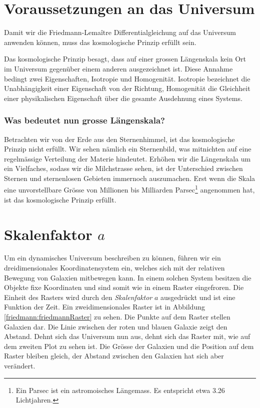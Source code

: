 \begin{refsection}
\section{Voraussetzungen an das Universum}
Damit wir die Friedmann-Lema\^{i}tre Differentialgleichung auf das Universum anwenden können, muss das kosmologische Prinzip erfüllt sein. 
\begin{satz}
	\label{Prinzip:kosmologisches Prinzip}
	Das kosmologische Prinzip besagt, dass auf einer grossen Längenskala kein Ort im Universum gegenüber einem anderen ausgezeichnet ist. Diese Annahme bedingt zwei Eigenschaften, Isotropie und Homogenität. Isotropie  bezeichnet die Unabhängigkeit einer Eigenschaft von der Richtung, Homogenität die Gleichheit einer physikalischen Eigenschaft über die gesamte Ausdehnung eines Systems.
\end{satz}

\subsubsection*{Was bedeutet nun grosse Längenskala?}
Betrachten wir von der Erde aus den Sternenhimmel, ist das kosmologische Prinzip nicht erfüllt. Wir sehen nämlich ein Sternenbild, was mitnichten auf eine regelmässige Verteilung der Materie hindeutet. Erhöhen wir die Längenskala um ein Vielfaches, sodass wir die Milchstrasse sehen, ist der Unterschied zwischen Sternen und sternenlosen Gebieten immernoch auszumachen. Erst wenn die Skala eine unvorstellbare Grösse von Millionen bis Milliarden Parsec\footnote{Ein Parsec ist ein astromoisches Längemass. Es entspricht etwa 3.26 Lichtjahren.} angenommen hat, ist das kosmologische Prinzip erfüllt. 

\section{Skalenfaktor $a$\label{Section:Skalenfaktor}}
Um ein dynamisches Universum beschreiben zu können, führen wir ein dreidimensionales Koordinatensystem ein, welches sich mit der relativen Bewegung von Galaxien mitbewegen kann. In einem solchen System besitzen die Objekte fixe Koordinaten und sind somit wie in einem Raster eingefroren. Die Einheit des Rasters wird durch den {\em Skalenfaktor} $a$ ausgedrückt und ist eine Funktion der Zeit. Ein zweidimensionales Raster ist in Abbildung \ref{friedmann:friedmannRaster} zu sehen. Die Punkte auf dem Raster stellen Galaxien dar. Die Linie zwischen der roten und blauen Galaxie zeigt den Abstand. Dehnt sich das Universum nun aus, dehnt sich das Raster mit, wie auf dem zweiten Plot zu sehen ist. Die Grösse der Galaxien und die Position auf dem Raster bleiben gleich, der Abstand zwischen den Galaxien hat sich aber verändert. 


\end{refsection}
